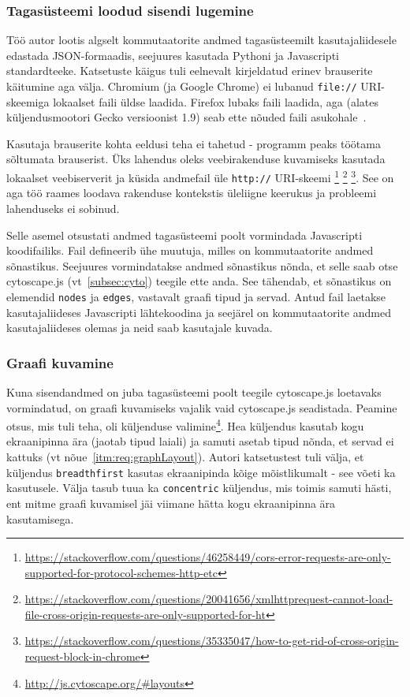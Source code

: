 \documentclass[12pt]{article}
\begin{document}
\subsubsection{Tagasüsteemi loodud sisendi lugemine} \label{dataInput}
Töö autor lootis algselt kommutaatorite andmed tagasüsteemilt kasutajaliidesele edastada
JSON-formaadis, seejuures kasutada Pythoni ja Javascripti standardteeke.
Katsetuste käigus tuli eelnevalt kirjeldatud erinev brauserite käitumine aga välja.
Chromium (ja Google Chrome) ei lubanud \texttt{file://} URI-skeemiga lokaalset faili üldse laadida.
Firefox lubaks faili laadida, aga (alates küljendusmootori Gecko versioonist 1.9) seab ette nõuded
faili asukohale~\cite{ffCORS}.

Kasutaja brauserite kohta eeldusi teha ei tahetud - programm peaks töötama sõltumata brauserist.
Üks lahendus oleks veebirakenduse kuvamiseks kasutada lokaalset veebiserverit ja küsida andmefail
üle \texttt{http://} URI-skeemi
\footnote{\url{https://stackoverflow.com/questions/46258449/cors-error-requests-are-only-supported-for-protocol-schemes-http-etc}}
\footnote{\url{https://stackoverflow.com/questions/20041656/xmlhttprequest-cannot-load-file-cross-origin-requests-are-only-supported-for-ht}}
\footnote{\url{https://stackoverflow.com/questions/35335047/how-to-get-rid-of-cross-origin-request-block-in-chrome}}.
See on aga töö raames loodava rakenduse kontekstis üleliigne keerukus ja probleemi lahenduseks ei
sobinud.

Selle asemel otsustati andmed tagasüsteemi poolt vormindada Javascripti koodifailiks.
Fail defineerib ühe muutuja, milles on kommutaatorite andmed sõnastikus.
Seejuures vormindatakse andmed sõnastikus nõnda, et selle saab otse cytoscape.js
(vt~\ref{subsec:cyto}) teegile ette anda.
See tähendab, et sõnastikus on elemendid \texttt{nodes} ja \texttt{edges}, vastavalt graafi tipud
ja servad.
Antud fail laetakse kasutajaliideses Javascripti lähtekoodina ja seejärel on kommutaatorite
andmed kasutajaliideses olemas ja neid saab kasutajale kuvada.

\subsubsection{Graafi kuvamine}
Kuna sisendandmed on juba tagasüsteemi poolt teegile cytoscape.js loetavaks vormindatud, on
graafi kuvamiseks vajalik vaid cytoscape.js seadistada.
Peamine otsus, mis tuli teha, oli küljenduse
valimine\footnote{\url{http://js.cytoscape.org/\#layouts}}.
Hea küljendus kasutab kogu ekraanipinna ära (jaotab tipud laiali) ja samuti asetab tipud nõnda, et
servad ei kattuks (vt nõue~\ref{itm:req:graphLayout}).
Autori katsetustest tuli välja, et küljendus \texttt{breadthfirst} kasutas ekraanipinda kõige
mõistlikumalt - see võeti ka kasutusele.
Välja tasub tuua ka \texttt{concentric} küljendus, mis toimis samuti hästi, ent mitme graafi
kuvamisel jäi viimane hätta kogu ekraanipinna ära kasutamisega.
\end{document}
